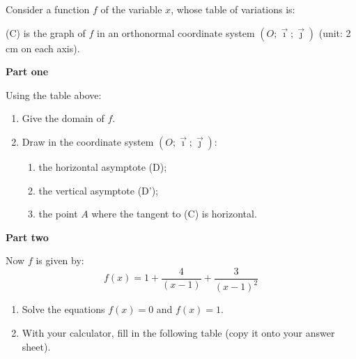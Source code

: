 {\parindent=0pt
Consider a function $f$ of the variable $x$, whose table of variations is:

\begin{center}
\end{center}

(C) is the graph of $f$ in an orthonormal coordinate system $(O;\vec{\imath};\vec{\jmath})$ (unit: 2 cm on each axis).

\vspace{6pt}
\textbf{Part one}

Using the table above:%

 \begin{enumerate}
 \item  Give the domain of $f$.
 \item  Draw in the coordinate system $(O;\vec{\imath};\vec{\jmath})$:
 \begin{enumerate}
 \item  the horizontal asymptote (D);
 \item  the vertical asymptote (D');
 \item  the point $A$ where the tangent to (C) is horizontal.
 \end{enumerate}
 \end{enumerate}

\textbf{Part two}

Now $f$ is given by:
\[
f(x)=1 + \dfrac{4}{(x-1)}    + \dfrac{3}{(x-1)^2}
\]
\begin{enumerate}
 \item Solve the equations $f(x)=0$ and $f(x)=1$.
 \item  With your calculator, fill in the following table
  (copy it onto your answer sheet).
\end{enumerate}
}


